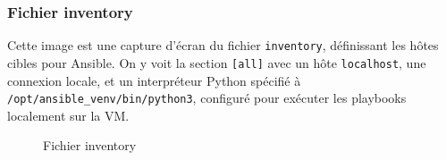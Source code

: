   \subsubsection{Fichier inventory}
Cette image est une capture d’écran du fichier \texttt{inventory}, définissant les hôtes cibles pour Ansible. On y voit la section \texttt{[all]} avec un hôte \texttt{localhost}, une connexion locale, et un interpréteur Python spécifié à \texttt{/opt/ansible\_venv/bin/python3}, configuré pour exécuter les playbooks localement sur la VM.
\begin{figure}[h]
      \begin{adjustwidth}{-3.5cm}{-3.5cm}
      \centering
      \caption{Fichier inventory}
      \label{fig:ansible03}
      \end{adjustwidth}
  \end{figure}
